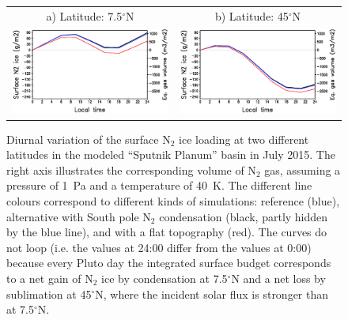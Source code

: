 \begin{figure}
  \begin{center}
\renewcommand{\arraystretch}{0.2}
\begin{tabular}[h]{cc}
\hspace{-2.cm}
  a) Latitude: 7.5$^\circ$N  & b) Latitude: 45$^\circ$N  \\
\hspace{-2.cm}
   \includegraphics[width=8.cm,angle=-0,clip]{figures/diuN2_7.eps} &
   \includegraphics[width=8.cm,angle=-0,clip]{figures/diuN2_45.eps} \\
\end{tabular}
    \caption{
\label{fg:diuN2}
Diurnal variation of the surface N$_2$ ice loading at two different latitudes in the modeled
``Sputnik Planum'' basin in July 2015. 
The right axis illustrates the corresponding volume of N$_2$ gas, assuming
a pressure of 1~Pa and a temperature of 40~K. The different line colours correspond to different
kinds of simulations: reference (blue), alternative with South pole N$_2$ condensation (black, partly
hidden by the blue line), and with a flat topography (red). The curves do not loop (i.e. the values
at 24:00 differ from the values at 0:00) because every Pluto day the integrated surface budget
corresponds
to a net gain of N$_2$ ice by condensation at 7.5$^\circ$N and a net loss by sublimation at
45$^\circ$N, where the incident solar flux is stronger than at 7.5$^\circ$N.
}
  \end{center}
\end{figure}


